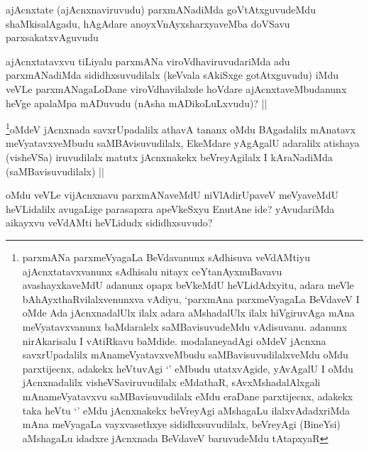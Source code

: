 \begin{artha}
ajAcnxtate (ajAcnxnaviruvudu) parxmANadiMda goVtAtxguvudeMdu shaMkisalAgadu, hAgAdare anoyxVnAyxsharxyaveMba doVSavu parxsakatxvAguvudu
\end{artha}

\begin{artha}
ajAcnxtatavxvu tiLiyalu parxmANa viroVdhaviruvudariMda adu parxmANadiMda sididhxsuvudilalx (keVvala sAkiSxge gotAtxguvudu) iMdu veVLe parxmANagaLoDane viroVdhavilalxde hoVdare ajAcnxtaveMbudanunx heVge apalaMpa mADuvudu (nAsha mADikoLuLxvudu)? ||
\end{artha}

\begin{artha}
\footnote{parxmANa parxmeVyagaLa BeVdavanunx sAdhisuva veVdAMtiyu ajAcnxtatavxvanunx sAdhisalu nitayx ceYtanAyxnuBavavu avashayxkaveMdU adanunx opapx beVkeMdU heVLidAdxyitu, adara meVle bAhAyxthaRvilalxvenunxva vAdiyu, `parxmAna parxmeVyagaLa BeVdaveV I oMde Ada jAcnxnadalUlx ilalx adara aMshadalUlx ilalx hiVgiruvAga mAna meVyatavxvanunx baMdaralelx saMBavisuvudeMdu vAdisuvanu. adanunx nirAkarisalu I vAtiRkavu baMdide. modalaneyadAgi oMdeV jAcnxna savxrUpadalilx mAnameVyatavxveMbudu saMBavisuvudilalxveMdu oMdu parxtijecnx, adakekx heVtuvAgi `\stext' eMbudu utatxvAgide, yAvAgalU I oMdu jAcnxnadalilx visheVSaviruvudilalx eMdathaR, sAvxMshadalAlxgali mAnameVyatavxvu saMBavisuvudilalx eMdu eraDane parxtijecnx, adakekx taka heVtu `\stext' eMdu jAcnxnakekx beVreyAgi aMshagaLu ilalxvAdadxriMda mAna meVyagaLa vayxvasethxye sididhxsuvudilalx, beVreyAgi (BineYsi) aMshagaLu idadxre jAcnxnada BeVdaveV baruvudeMdu tAtapxyaR}oMdeV jAcnxnada savxrUpadalilx athavA tananx oMdu BAgadalilx mAnatavx meVyatavxveMbudu saMBAvisuvudilalx, EkeMdare yAgAgalU adaralilx atishaya (visheVSa) iruvudilalx matutx jAcnxnakekx beVreyAgilalx I kAraNadiMda (saMBavisuvudilalx) ||
\end{artha}

\begin{artha}
oMdu veVLe vijAcnxnavu parxmANaveMdU niVlAdirUpaveV meVyaveMdU heVLidalilx avugaLige parasapxra apeVkeSxyu EnutAne ide? yAvudariMda aikayxvu veVdAMti heVLidudx sididhxsuvudo? 
\end{artha}

